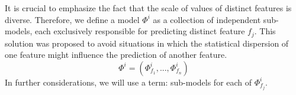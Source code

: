 
 
 
 \noindent It is crucial to emphasize the fact that the scale of values of distinct features is diverse. Therefore, we define a model $\Phi^i$ as a collection of independent sub-models, each exclusively responsible for predicting distinct feature $f_j$. This solution was proposed to avoid situations in which the statistical dispersion of one feature might influence the prediction of another feature.  
 \[
 \Phi^{i} = (\Phi^{i}_{f_1}, ..., \Phi^{i}_{f_n})
 \]
 In further considerations, we will use a term: sub-models for each of $\Phi^{i}_{f_j}$.

